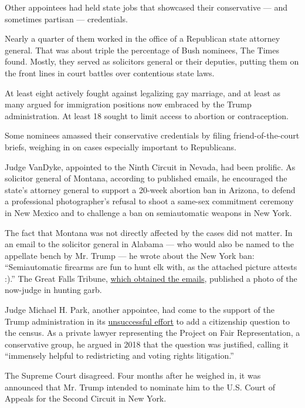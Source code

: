 Other appointees had held state jobs that showcased their conservative
--- and sometimes partisan --- credentials.

Nearly a quarter of them worked in the office of a Republican state
attorney general. That was about triple the percentage of Bush nominees,
The Times found. Mostly, they served as solicitors general or their
deputies, putting them on the front lines in court battles over
contentious state laws.

At least eight actively fought against legalizing gay marriage, and at
least as many argued for immigration positions now embraced by the Trump
administration. At least 18 sought to limit access to abortion or
contraception.

Some nominees amassed their conservative credentials by filing
friend-of-the-court briefs, weighing in on cases especially important to
Republicans.

Judge VanDyke, appointed to the Ninth Circuit in Nevada, had been
prolific. As solicitor general of Montana, according to published
emails, he encouraged the state's attorney general to support a 20-week
abortion ban in Arizona, to defend a professional photographer's refusal
to shoot a same-sex commitment ceremony in New Mexico and to challenge a
ban on semiautomatic weapons in New York.

The fact that Montana was not directly affected by the cases did not
matter. In an email to the solicitor general in Alabama --- who would
also be named to the appellate bench by Mr. Trump --- he wrote about the
New York ban: ``Semiautomatic firearms are fun to hunt elk with, as the
attached picture attests :).'' The Great Falls Tribune,
\href{https://www.greatfallstribune.com/story/news/local/2014/09/17/vandyke-politician-nature/15812491/}{which
obtained the emails}, published a photo of the now-judge in hunting
garb.

Judge Michael H. Park, another appointee, had come to the support of the
Trump administration in its
\href{https://www.nytimes.com/2019/06/27/us/politics/census-citizenship-question-supreme-court.html}{unsuccessful
effort} to add a citizenship question to the census. As a private lawyer
representing the Project on Fair Representation, a conservative group,
he argued in 2018 that the question was justified, calling it
``immensely helpful to redistricting and voting rights litigation.''

The Supreme Court disagreed. Four months after he weighed in, it was
announced that Mr. Trump intended to nominate him to the U.S. Court of
Appeals for the Second Circuit in New York.

